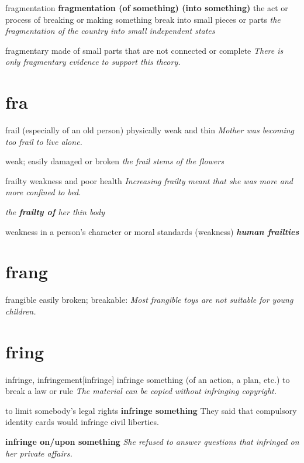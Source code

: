 \begin{DefWord}{fragmentation}
    \textbf{fragmentation (of something) (into something)} the act or process of breaking or making something break into small pieces or parts
    \textit{the fragmentation of the country into small independent states}
\end{DefWord}


\begin{DefWord}{fragmentary}
    made of small parts that are not connected or complete
    \textit{There is only fragmentary evidence to support this theory.}

\end{DefWord}




\section{fra}

\begin{DefWord}{frail}
    (especially of an old person) physically weak and thin
    \textit{Mother was becoming too frail to live alone.}

    weak; easily damaged or broken
    \textit{the frail stems of the flowers}
\end{DefWord}

\begin{DefWord}{frailty}
    weakness and poor health
    \textit{Increasing frailty meant that she was more and more confined to bed.}

    \textit{the \textbf{frailty of} her thin body}

    weakness in a person's character or moral standards (weakness)
    \textit{\textbf{human frailties}}
\end{DefWord}

\section{frang}

\begin{DefWord}{frangible}
    easily broken; breakable:
\textit{Most frangible toys are not suitable for young children.}
\end{DefWord}

\section{fring}

\begin{DefWord}{infringe, infringement}[infringe]
    infringe something (of an action, a plan, etc.) to break a law or rule
    \textit{The material can be copied without infringing copyright.}

    to limit somebody's legal rights
    \textbf{infringe something} They said that compulsory identity cards would infringe civil liberties.

    \textbf{infringe on/upon something} \textit{She refused to answer questions that infringed on her private affairs.}
\end{DefWord}



